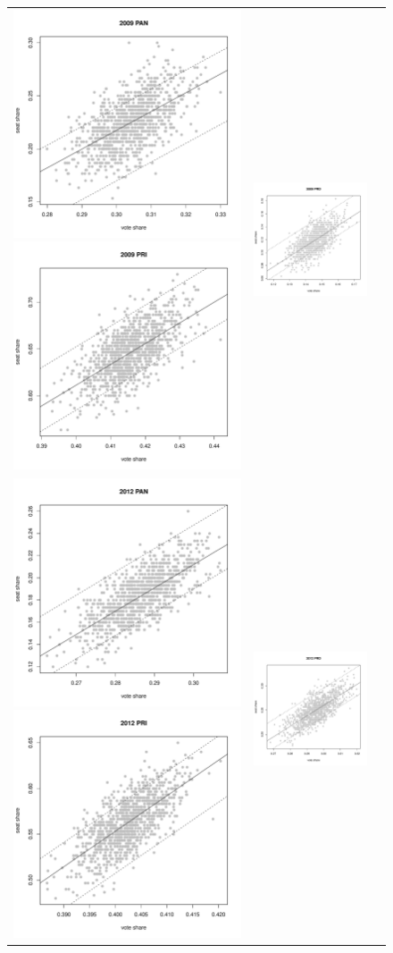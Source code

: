 \documentclass[letter,12pt]{article}
\begin{document}
\begin{figure}
\begin{tabular}{ccc}
  \includegraphics[width=.25\columnwidth]{../graphs/appendixPlots/95ciSwR-20092.pdf} 
  \includegraphics[width=.25\columnwidth]{../graphs/appendixPlots/95ciSwR-20091.pdf} &
  \includegraphics[width=.25\columnwidth]{../graphs/appendixPlots/95ciSwR-20093.pdf} \\
  \includegraphics[width=.25\columnwidth]{../graphs/appendixPlots/95ciSwR-20122.pdf} 
  \includegraphics[width=.25\columnwidth]{../graphs/appendixPlots/95ciSwR-20121.pdf} &
  \includegraphics[width=.25\columnwidth]{../graphs/appendixPlots/95ciSwR-20123.pdf} \\

\end{tabular}
\end{figure}
\end{document}
